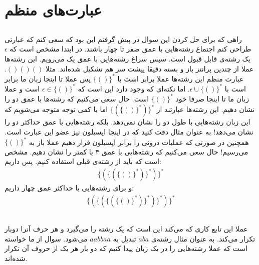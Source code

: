 \section{عبارت‌های منظم}
\subsection{}
راهی که برای حل کردن این سوال در پیش گرفتم این بود که سعی کنم که عبارتی طراحی کنم اجتماع رشته‌هایی با عمق صفر
تا چهار باشند. در ابتدا مشخص است که
$\epsilon$
یک رشته‌ی قابل قبول است. سپس سراغ رشته‌هایی با عمق یک می‌رویم.
این رشته‌ها عملا از چندین پرانتز باز و بسته دقیقا پیشت سر هم تشکیل شده‌اند. مثلا
$()()()$.
عبارت منظم این رشته‌ها عملا برابر است با
$\{()\}^*$
پس عملا تا اینجا زبان ما برابر است با
$\epsilon \cup \{()\}^*$.
اما نکته‌ای که وجود دارد این است که
$\epsilon \in \{()\}^*$
است و عملا زبان ما تا اینجا صرفا خود
$\{()\}^*$
است. حال سعی ‌می‌کنیم که رشته‌ها با عمق دو را نشان دهیم. این رشته‌ها عبارتند از
$\{\left({\{()\}^*}\right)\}^*$
اما با کمی توجه متوجه می‌شویم که این زبان رشته‌هایی با طول دو را نشان نمی‌دهد. بلکه رشته‌هایی با عمق حداکثر
دو را نشان می‌دهد! به عنوان مثال دقت کنید که در اینجا اپسیلون نیز عضو این عبارت است. همچنین در صورتی که
عملیات
درونی را برابر اپسیلون قرار دهیم عملا باز به
$\{()\}^*$
می‌رسیم!
حال سعی می‌کنیم که رشته‌هایی با عمق ۳ یا کمتر را نشان دهیم. مشخص است که باید از رشته‌ی قبلی استفاده کنیم.
پس داریم:
\begin{gather*}
    \{\left({
        \{\left({
            \{()\}^*
        }\right)\}^*
    }\right)\}^*
\end{gather*}
و برای رشته‌هایی با حداکثر عمق چهار داریم:
\begin{gather*}
    \{\left({
        \{\left({
            \{\left({
                \{()\}^*
            }\right)\}^*
        }\right)\}^*
    }\right)\}^*
\end{gather*}
\subsection{}
عملا این تابع کاری که می‌کند این است که یک رشته را می‌گیرد و هر حرف آنرا دوبار تکرار می‌کند.
به عنوان مثال رشته‌ی
$aba$
تبدیل به
$aabbaa$
می‌شود. سوال از ما خواسته است که عملا رشته‌هایی را در یک زبان پیدا کنیم که دو بار هر یک از حروف آن تکرار شده‌اند.

